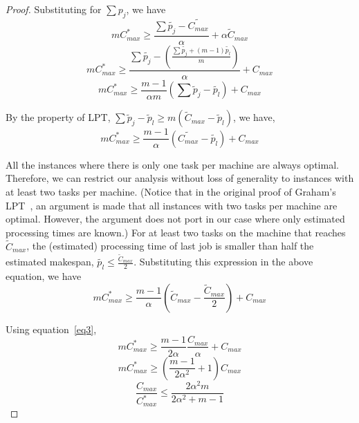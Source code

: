 \documentclass[twocolumn]{svjour3}
\begin{document}
\begin{proof}
Substituting for  $ \sum {p_j}$, we have
 \begin{equation}\nonumber 
 m C_{max}^{*}\geq \frac{\sum \tilde{p_j}- \tilde{C_{max}}}{\alpha} + \alpha \tilde C_{max}
 \end{equation} 
\begin{equation}\nonumber 
 m C_{max}^{*}\geq \frac{\sum \tilde{p_j} - \left( \frac{\sum{\tilde{p_j} + (m-1) \tilde{p_l} }}{m} \right )} {\alpha} + {C_{max}}
\end{equation}
\begin{equation}\nonumber
 m C_{max}^{*}\geq \frac{m-1}{\alpha m} \left( \sum \tilde p_j - \tilde{p_l} \right) + {C_{max}}
 \end{equation}

 By the property of LPT, $\sum \tilde p_j-\tilde p_l \geq m (\tilde C_{max}-\tilde p_l)$, we have,
\begin{equation}\nonumber 
  m C_{max}^{*}\geq \frac{m-1}{\alpha } \left( \tilde{C_{max}} - \tilde{ p_l} \right) + {C_{max}}
 \end{equation}
 
 All the instances where there is only one task per machine are always
 optimal. Therefore, we can restrict our analysis without loss of
 generality to instances with at least two tasks per machine. (Notice
 that in the original proof of Graham's LPT~\cite{Graham69boundson},
 an argument is made that all instances with two tasks per machine are
 optimal. However, the argument does not port in our case where only
 estimated processing times are known.) For at least two tasks on the
 machine that reaches $\tilde{C}_{max}$, the (estimated)
 processing time of last job is smaller than half the estimated
 makespan, $\tilde{p_l} \leq \frac{\tilde{C}_{max}}{2}$. Substituting
 this expression in the above equation, we have
\begin{equation}\nonumber
 m C_{max}^{*}\geq \frac{m-1}{\alpha } \left( \tilde C_{max}-\frac{\tilde C_{max}}{2} \right ) + {C_{max}}
\end{equation}

Using equation~\ref{eq3},
\begin{equation}\nonumber
 m C_{max}^{*}\geq \frac{m-1}{2\alpha } \frac{C_{max}} {\alpha} + {C_{max}}
\end{equation}
\begin{equation}\nonumber
 m C_{max}^{*}\geq \left( \frac{m-1}{2\alpha^{2} } +1\right){C_{max}}
\end{equation}
\begin{equation}\nonumber
\frac{C_{max}}{C_{max}^{*}}\leq \frac{2\alpha^{2}m}{2\alpha^{2}+ m-1}
\end{equation}
\end{proof} 
\end{document}
